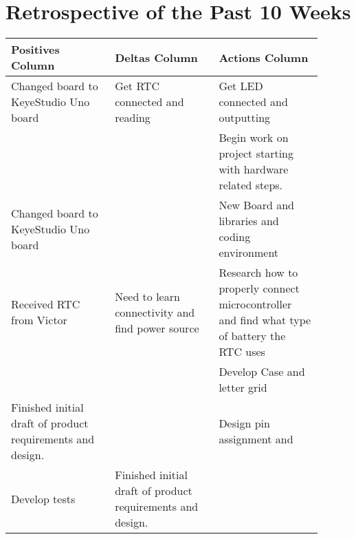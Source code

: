 \documentclass[onecolumn, draftclsnofoot,10pt, compsoc]{IEEEtran}
\begin{document}
\section{Retrospective of the Past 10 Weeks}
\vspace{2mm}
\begin{center}
\begin{tabular}{| p{0.3\linewidth} | p{0.3\linewidth} | p{0.3\linewidth} |}
\hline
Positives Column &
Deltas Column &
Actions Column \\
\hline
Changed board to KeyeStudio Uno board &
Get RTC connected and reading &
Get LED connected and outputting \\
\hline
 &
 &
Begin work on project starting with hardware related steps.  \\
\hline
Changed board to KeyeStudio Uno board &
 &
New Board and libraries and coding environment \\
\hline
Received RTC from Victor &
Need to learn connectivity and find power source &
Research how to properly connect microcontroller and find what type of battery the RTC uses \\
\hline
 &
 &
Develop Case and letter grid \\
\hline
Finished initial draft of product requirements and design. &
&
Design pin assignment and \\
\hline
Develop tests &
Finished initial draft of product requirements and design. &
\\
\hline


\end{tabular}
\end{center}
\end{document}
